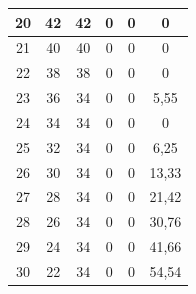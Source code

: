 \begin{table}[]
\begin{tabular}{|c|c|c|c|c|c|}
 			20                                           & 42                     & 42                    & 0                     & 0                      & 0                                                  \\ \hline
 			21                                           & 40                     & 40                    & 0                     & 0                      & 0                                                  \\ \hline
 			22                                           & 38                     & 38                    & 0                     & 0                      & 0                                                  \\ \hline
 			23                                           & 36                     & 34                    & 0                     & 0                      & 5,55                                        \\ \hline
 			24                                           & 34                     & 34                    & 0                     & 0                      & 0                                                  \\ \hline
 			25                                           & 32                     & 34                    & 0                     & 0                      & 6,25                                               \\ \hline
 			26                                           & 30                     & 34                    & 0                     & 0                      & 13,33                                      \\ \hline
 			27                                           & 28                     & 34                    & 0                     & 0                      & 21,42                                        \\ \hline
 			28                                           & 26                     & 34                    & 0                     & 0                      & 30,76                                        \\ \hline
 			29                                           & 24                     & 34                    & 0                     & 0                      & 41,66                                      \\ \hline
 			30                                           & 22                     & 34                    & 0                     & 0                      & 54,54                                       \\ \hline

\end{tabular}
\end{table}
